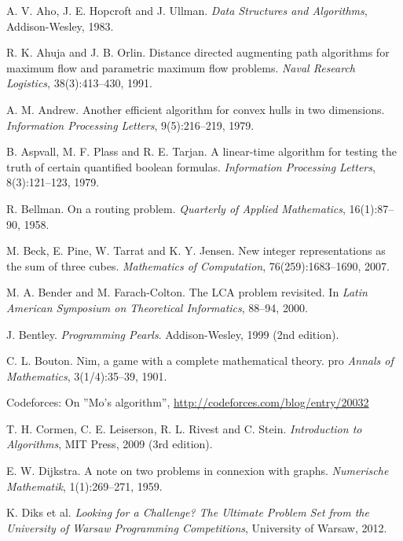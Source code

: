 \begin{thebibliography}{9}

  A. V. Aho, J. E. Hopcroft and J. Ullman.
  \emph{Data Structures and Algorithms},
  Addison-Wesley, 1983.

  R. K. Ahuja and J. B. Orlin.
  Distance directed augmenting path algorithms for maximum flow and parametric maximum flow problems.
  \emph{Naval Research Logistics}, 38(3):413--430, 1991.

  A. M. Andrew.
  Another efficient algorithm for convex hulls in two dimensions.
  \emph{Information Processing Letters}, 9(5):216--219, 1979.

  B. Aspvall, M. F. Plass and R. E. Tarjan.
  A linear-time algorithm for testing the truth of certain quantified boolean formulas.
  \emph{Information Processing Letters}, 8(3):121--123, 1979.

  R. Bellman.
  On a routing problem.
  \emph{Quarterly of Applied Mathematics}, 16(1):87--90, 1958.

  M. Beck, E. Pine, W. Tarrat and K. Y. Jensen.
  New integer representations as the sum of three cubes.
  \emph{Mathematics of Computation}, 76(259):1683--1690, 2007.

  M. A. Bender and M. Farach-Colton.
  The LCA problem revisited. In
  \emph{Latin American Symposium on Theoretical Informatics}, 88--94, 2000.

  J. Bentley.
  \emph{Programming Pearls}.
  Addison-Wesley, 1999 (2nd edition).

  C. L. Bouton.
  Nim, a game with a complete mathematical theory.
pro  \emph{Annals of Mathematics}, 3(1/4):35--39, 1901.


  Codeforces: On ''Mo's algorithm'',
  \url{http://codeforces.com/blog/entry/20032}

  T. H. Cormen, C. E. Leiserson, R. L. Rivest and C. Stein.
  \emph{Introduction to Algorithms}, MIT Press, 2009 (3rd edition).

  E. W. Dijkstra.
  A note on two problems in connexion with graphs.
  \emph{Numerische Mathematik}, 1(1):269--271, 1959.

  K. Diks et al.
  \emph{Looking for a Challenge? The Ultimate Problem Set from
  the University of Warsaw Programming Competitions}, University of Warsaw, 2012.


\end{thebibliography}
